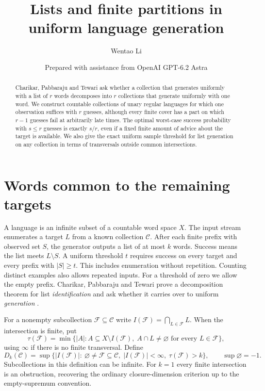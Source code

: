 \documentclass[11pt]{article}
\title{Lists and finite partitions in uniform language generation}
\author{Wentao Li}
\date{\small Prepared with assistance from OpenAI GPT-6.2 Astra}
\newcommand{\C}{\mathcal C}
\newcommand{\F}{\mathcal F}
\begin{document}
\maketitle
\begin{abstract}
Charikar, Pabbaraju and Tewari ask whether a collection that generates uniformly with a list of $r$ words decomposes into $r$ collections that generate uniformly with one word. We construct countable collections of unary regular languages for which one observation suffices with $r$ guesses, although every finite cover has a part on which $r-1$ guesses fail at arbitrarily late times. The optimal worst-case success probability with $s\le r$ guesses is exactly $s/r$, even if a fixed finite amount of advice about the target is available. We also give the exact uniform sample threshold for list generation on any collection in terms of transversals outside common intersections.
\end{abstract}

\section{Words common to the remaining targets}
A language is an infinite subset of a countable word space $X$. The input stream enumerates a target $L$ from a known collection $\C$. After each finite prefix with observed set $S$, the generator outputs a list of at most $k$ words. Success means the list meets $L\setminus S$. A uniform threshold $t$ requires success on every target and every prefix with $|S|\ge t$. This includes enumeration without repetition. Counting distinct examples also allows repeated inputs. For a threshold of zero we allow the empty prefix. Charikar, Pabbaraju and Tewari prove a decomposition theorem for list \emph{identification} and ask whether it carries over to uniform \emph{generation} \cite[Section 5]{cpt}.

For a nonempty subcollection $\F\subseteq\C$ write $I(\F)=\bigcap_{L\in\F} L$. When the intersection is finite, put
\[
 \tau(\F)=\min\{|A|: A\subseteq X\setminus I(\F),\;
                 A\cap L\ne\varnothing\text{ for every }L\in\F\},
\]
using $\infty$ if there is no finite transversal. Define
\[
 D_k(\C)=\sup\{|I(\F)|:\ \varnothing\ne\F\subseteq\C,\;
             |I(\F)|<\infty,\;\tau(\F)>k\},\qquad \sup\varnothing=-1.
\]
Subcollections in this definition can be infinite. For $k=1$ every finite intersection is an obstruction, recovering the ordinary closure-dimension criterion \cite{rlt} up to the empty-supremum convention.
\end{document}
